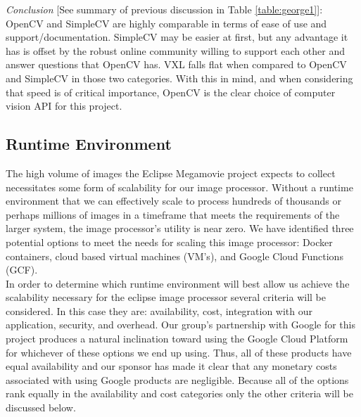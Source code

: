 \documentclass[10pt, onecolumn, draftclsnofoot, letterpaper, compsoc]{IEEEtran}
\begin{document}
\textit{Conclusion} [See summary of previous discussion in Table
\ref{table:george1}]: OpenCV and SimpleCV are highly comparable in terms of ease
of use and support/documentation. SimpleCV may be easier at first, but any
advantage it has is offset by the robust online community willing to support
each other and answer questions that OpenCV has. VXL falls flat when compared to
OpenCV and SimpleCV in those two categories. With this in mind, and when
considering that speed is of critical importance, OpenCV is the clear choice of
computer vision API for this project. \\

\subsection{Runtime Environment}

The high volume of images the Eclipse Megamovie project expects to collect
necessitates some form of scalability for our image processor. Without a runtime
environment that we can effectively scale to process hundreds of thousands or
perhaps millions of images in a timeframe that meets the requirements of the
larger system, the image processor's utility is near zero. We have identified
three potential options to meet the needs for scaling this image processor:
Docker containers, cloud based virtual machines (VM's), and Google Cloud
Functions (GCF).\\

In order to determine which runtime environment will best allow us achieve the
scalability necessary for the eclipse image processor several criteria will be
considered. In this case they are: availability, cost, integration with our
application, security, and overhead. Our group's partnership with Google for
this project produces a natural inclination toward using the Google Cloud
Platform for whichever of these options we end up using. Thus, all of these
products have equal availability and our sponsor has made it clear that any
monetary costs associated with using Google products are negligible. Because all
of the options rank equally in the availability and cost categories only the
other criteria will be discussed below. \\
\end{document}
